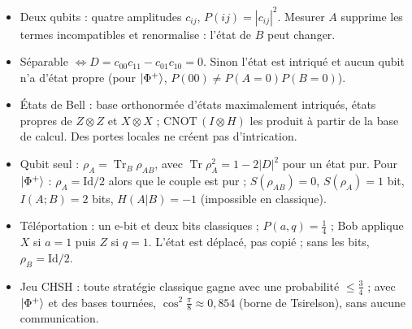 \begin{aretenir}
\begin{itemize}
  \item Deux qubits : quatre amplitudes $c_{ij}$, $P(ij)=|c_{ij}|^2$. Mesurer $A$ supprime les termes
        incompatibles et renormalise : l'état de $B$ peut changer.
  \item Séparable $\Longleftrightarrow D=c_{00}c_{11}-c_{01}c_{10}=0$. Sinon l'état est intriqué et
        aucun qubit n'a d'état propre (pour $|\Phi^+\rangle$, $P(00)\neq P(A{=}0)P(B{=}0)$).
  \item États de Bell : base orthonormée d'états maximalement intriqués, états propres de
        $Z\otimes Z$ et $X\otimes X$ ; $\mathrm{CNOT}\,(I\otimes H)$ les produit à partir de la base de
        calcul. Des portes locales ne créent pas d'intrication.
  \item Qubit seul : $\rho_A=\operatorname{Tr}_B\rho_{AB}$, avec $\operatorname{Tr}\rho_A^2=1-2|D|^2$ pour un état pur.
        Pour $|\Phi^+\rangle$ : $\rho_A=\mathrm{Id}/2$ alors que le couple est pur ; $S(\rho_{AB})=0$,
        $S(\rho_A)=1$ bit, $I(A;B)=2$ bits, $H(A|B)=-1$ (impossible en classique).
  \item Téléportation : un e-bit et deux bits classiques ; $P(a,q)=\frac14$ ; Bob applique $X$ si $a=1$
        puis $Z$ si $q=1$. L'état est déplacé, pas copié ; sans les bits, $\rho_B=\mathrm{Id}/2$.
  \item Jeu CHSH : toute stratégie classique gagne avec une probabilité $\leq\frac34$ ; avec $|\Phi^+\rangle$
        et des bases tournées, $\cos^2\frac\pi8\approx0{,}854$ (borne de Tsirelson), sans aucune
        communication.
\end{itemize}
\end{aretenir}


